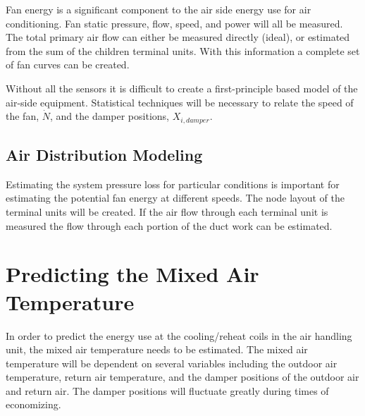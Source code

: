 Fan energy is a significant component to the air side energy use for air conditioning. Fan static pressure, flow, speed, and power will all be measured. The total primary air flow can either be measured directly (ideal), or estimated from the sum of the children terminal units. With this information a complete set of fan curves can be created. 

Without all the sensors it is difficult to create a first-principle based model of the air-side equipment. Statistical techniques will be necessary to relate the speed of the fan, \(\dot N\), and the damper positions, \(X_{i,damper}\). 

\subsection{Air Distribution Modeling}

Estimating the system pressure loss for particular conditions is important for estimating the potential fan energy at different speeds. The node layout of the terminal units will be created. If the air flow through each terminal unit is measured the flow through each portion of the duct work can be estimated. 

\section{Predicting the Mixed Air Temperature}

In order to predict the energy use at the cooling/reheat coils in the air handling unit, the mixed air temperature needs to be estimated. The mixed air temperature will be dependent on several variables including the outdoor air temperature, return air temperature, and the damper positions of the outdoor air and return air. The damper positions will fluctuate greatly during times of economizing.  

\begin{sidewaysfigure}
\end{sidewaysfigure}



























